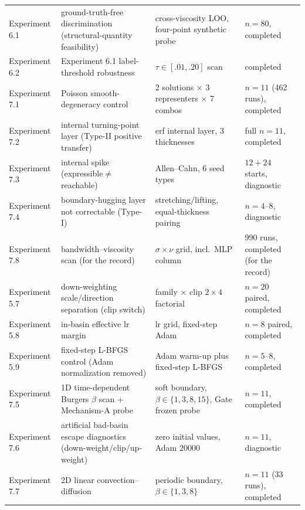 \documentclass[11pt]{article}
\numberwithin{equation}{section}
\begin{document}
{\begin{longtable}{p{2.2cm}p{4.2cm}p{2.6cm}p{2.3cm}}
Experiment 6.1 & ground-truth-free discrimination (structural-quantity feasibility) & cross-viscosity LOO, four-point synthetic probe & $n=80$, completed\\
Experiment 6.2 & Experiment 6.1 label-threshold robustness & $\tau\in[.01,.20]$ scan & completed\\
Experiment 7.1 & Poisson smooth-degeneracy control & 2 solutions $\times$ 3 representers $\times$ 7 combos & $n=11$ (462 runs), completed\\
Experiment 7.2 & internal turning-point layer (Type-II positive transfer) & erf internal layer, 3 thicknesses & full $n=11$, completed\\
Experiment 7.3 & internal spike (expressible$\ne$reachable) & Allen--Cahn, 6 seed types & $12+24$ starts, diagnostic\\
Experiment 7.4 & boundary-hugging layer not correctable (Type-I) & stretching/lifting, equal-thickness pairing & $n=4$--$8$, diagnostic\\
Experiment 7.8 & bandwidth--viscosity scan (for the record) & $\sigma\times\nu$ grid, incl.\ MLP column & 990 runs, completed (for the record)\\
Experiment 5.7 & down-weighting scale/direction separation (clip switch) & family $\times$ clip $2\times4$ factorial & $n=20$ paired, completed\\
Experiment 5.8 & in-basin effective lr margin & lr grid, fixed-step Adam & $n=8$ paired, completed\\
Experiment 5.9 & fixed-step L-BFGS control (Adam normalization removed) & Adam warm-up plus fixed-step L-BFGS & $n=5$--$8$, completed\\
Experiment 7.5 & 1D time-dependent Burgers $\beta$ scan + Mechanism-A probe & soft boundary, $\beta\in\{1,3,8,15\}$, Gate frozen probe & $n=11$, completed\\
Experiment 7.6 & artificial bad-basin escape diagnostics (down-weight/clip/up-weight) & zero initial values, Adam $20000$ & $n=11$, diagnostic\\
Experiment 7.7 & 2D linear convection--diffusion & periodic boundary, $\beta\in\{1,3,8\}$ & $n=11$ (33 runs), completed\\
\end{longtable}
}


\end{document}
